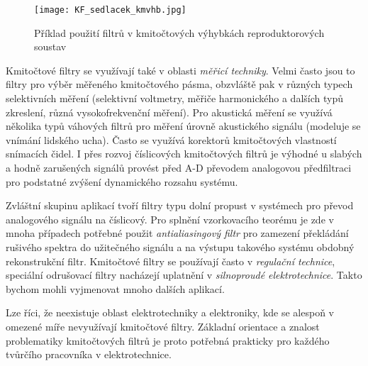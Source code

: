 {        \begin{figure}[ht!]
          \centering
          \texttt{[image: KF\_sedlacek\_kmvhb.jpg]}
          \caption[Příklad použití filtrů v kmitočtových výhybkách reproduktorových
                   soustav]{Příklad použití filtrů v kmitočtových výhybkách reproduktorových
                   soustav}
          \label{aes:fig_KF_sedlacek_kmvhb}    
        \end{figure} 
      
        Kmitočtové filtry se využívají také v oblasti \emph{měřicí techniky}. Velmi často jsou to
        filtry pro výběr měřeného kmitočtového pásma, obzvláště pak v různých typech selektivních
        měření (selektivní voltmetry, měřiče harmonického a dalších typů zkreslení, různá
        vysokofrekvenční měření). Pro akustická měření se využívá několika typů váhových filtrů pro
        měření úrovně akustického signálu (modeluje se vnímání lidského ucha). Často se využívá
        korektorů kmitočtových vlastností snímacích čidel. I přes rozvoj číslicových kmitočtových
        filtrů je výhodné u slabých a hodně zarušených signálů provést před A-D převodem analogovou
        předfiltraci pro podstatné zvýšení dynamického rozsahu systému.

        Zvláštní skupinu aplikací tvoří filtry typu dolní propust v systémech pro převod analogového
        signálu na číslicový. Pro splnění vzorkovacího teorému je zde v mnoha případech potřebné
        použit \emph{antialiasingový filtr} pro zamezení překládání rušivého spektra do užitečného
        signálu a na výstupu takového systému obdobný rekonstrukční filtr. Kmitočtové filtry se
        používají často v \emph{regulační technice}, speciální odrušovací filtry nacházejí uplatnění
        v \emph{silnoproudé elektrotechnice}. Takto bychom mohli vyjmenovat mnoho dalších aplikací.

        Lze říci, že neexistuje oblast elektrotechniky a elektroniky, kde se alespoň v omezené míře
        nevyužívají kmitočtové filtry. Základní orientace a znalost problematiky kmitočtových filtrů
        je proto potřebná prakticky pro každého tvůrčího pracovníka v elektrotechnice.
    
}
